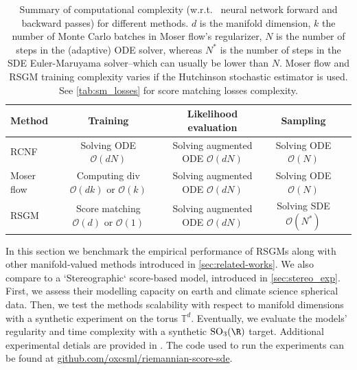 \label{sec:experiments-rsgm}
\begin{table}[t]
	\centering
	\small
	\renewcommand*{\arraystretch}{1.4}
	\begin{tabular}{l|cccc}
		\toprule
		Method     & Training                                                     & Likelihood evaluation                   & Sampling                     \\
		\midrule
		RCNF       & Solving ODE $\mathcal{O}(dN)$                                & Solving augmented ODE $\mathcal{O}(dN)$ & Solving ODE $\mathcal{O}(N)$ \\
		Moser flow & Computing $\text{div}$ $\mathcal{O}(dk)$ or $\mathcal{O}(k)$ & Solving augmented ODE $\mathcal{O}(dN)$ & Solving ODE $\mathcal{O}(N)$ \\ RSGM & Score matching $\mathcal{O}(d)$ or $\mathcal{O}(1)$ & Solving augmented ODE $\mathcal{O}(dN)$ & Solving SDE $\mathcal{O}(N^*)$ \\ \bottomrule\end{tabular}

	\caption{ \small Summary of computational complexity (w.r.t. \ neural network forward and backward passes) for different methods.
		$d$ is the manifold
		dimension, $k$ the number of Monte Carlo batches in Moser flow's regularizer,
		$N$ is the number of steps in the (adaptive) ODE solver, whereas $N^*$ is the
		number of steps in the SDE Euler-Maruyama solver--which can usually be lower
		than $N$.
		Moser flow and RSGM training complexity varies if the Hutchinson stochastic estimator is used.
		See \cref{tab:sm_losses} for score matching losses complexity.
	}
	\label{tab:comparison_methods}
\end{table}
In this section we benchmark the empirical performance of RSGMs along with other manifold-valued methods introduced in \cref{sec:related-works}.
We also compare to a `Stereographic` score-based model, introduced in \cref{sec:stereo_exp}.
First, we assess their modelling capacity on earth and climate science spherical data.
Then, we test the methods scalability with respect to manifold dimensions with a synthetic experiment on the torus $\mathbb{T}^d$.
Eventually, we evaluate the models' regularity and time complexity with a synthetic $\mathrm{SO}_3(\R)$ target.
Additional experimental detials are provided in .
The code used to run the experiments can be found at \href{https://github.com/oxcsml/riemannian-score-sde}{github.com/oxcsml/riemannian-score-sde}.

